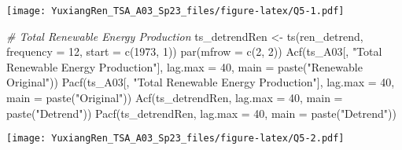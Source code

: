 \documentclass[
]{article}
\newenvironment{Shaded}{\begin{snugshade}}{\end{snugshade}}
\newcommand{\AttributeTok}[1]{\textcolor[rgb]{0.77,0.63,0.00}{#1}}
\newcommand{\CommentTok}[1]{\textcolor[rgb]{0.56,0.35,0.01}{\textit{#1}}}
\newcommand{\DecValTok}[1]{\textcolor[rgb]{0.00,0.00,0.81}{#1}}
\newcommand{\FunctionTok}[1]{\textcolor[rgb]{0.00,0.00,0.00}{#1}}
\newcommand{\NormalTok}[1]{#1}
\newcommand{\OtherTok}[1]{\textcolor[rgb]{0.56,0.35,0.01}{#1}}
\newcommand{\StringTok}[1]{\textcolor[rgb]{0.31,0.60,0.02}{#1}}
\begin{document}
\texttt{[image: YuxiangRen\_TSA\_A03\_Sp23\_files/figure-latex/Q5-1.pdf]}

\begin{Shaded}
\begin{Highlighting}[]
\CommentTok{\# Total Renewable Energy Production}
\NormalTok{ts\_detrendRen }\OtherTok{\textless{}{-}} \FunctionTok{ts}\NormalTok{(ren\_detrend, }\AttributeTok{frequency =} \DecValTok{12}\NormalTok{, }\AttributeTok{start =} \FunctionTok{c}\NormalTok{(}\DecValTok{1973}\NormalTok{, }\DecValTok{1}\NormalTok{))}
\FunctionTok{par}\NormalTok{(}\AttributeTok{mfrow =} \FunctionTok{c}\NormalTok{(}\DecValTok{2}\NormalTok{, }\DecValTok{2}\NormalTok{))}
\FunctionTok{Acf}\NormalTok{(ts\_A03[, }\StringTok{"Total Renewable Energy Production"}\NormalTok{], }\AttributeTok{lag.max =} \DecValTok{40}\NormalTok{, }\AttributeTok{main =} \FunctionTok{paste}\NormalTok{(}\StringTok{"Renewable Original"}\NormalTok{))}
\FunctionTok{Pacf}\NormalTok{(ts\_A03[, }\StringTok{"Total Renewable Energy Production"}\NormalTok{], }\AttributeTok{lag.max =} \DecValTok{40}\NormalTok{, }\AttributeTok{main =} \FunctionTok{paste}\NormalTok{(}\StringTok{"Original"}\NormalTok{))}
\FunctionTok{Acf}\NormalTok{(ts\_detrendRen, }\AttributeTok{lag.max =} \DecValTok{40}\NormalTok{, }\AttributeTok{main =} \FunctionTok{paste}\NormalTok{(}\StringTok{"Detrend"}\NormalTok{))}
\FunctionTok{Pacf}\NormalTok{(ts\_detrendRen, }\AttributeTok{lag.max =} \DecValTok{40}\NormalTok{, }\AttributeTok{main =} \FunctionTok{paste}\NormalTok{(}\StringTok{"Detrend"}\NormalTok{))}
\end{Highlighting}
\end{Shaded}

\texttt{[image: YuxiangRen\_TSA\_A03\_Sp23\_files/figure-latex/Q5-2.pdf]}
\end{document}
